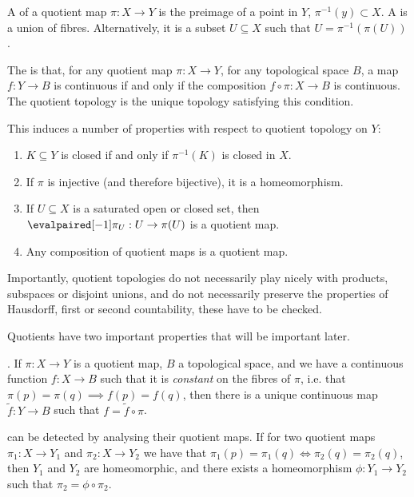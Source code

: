 A  of a quotient map \(\pi: X \to Y\) is the preimage of a point in \(Y\), \(\pi^{-1}(y) \subset X\).
A  is a union of fibres.
Alternatively, it is a subset \(U \subseteq X\) such that \(U = \pi^{-1}(\pi(U))\).

The  is that, for any quotient map \(\pi : X \to Y\), for any topological space \(B\), a map \(f: Y\to B\) is continuous if and only if the composition \(f \circ \pi : X \to B\) is continuous.
The quotient topology is the unique topology satisfying this condition.

This induces a number of properties with respect to quotient topology on \(Y\): \begin{enumerate}[noitemsep] \item \(K \subseteq Y\) is closed if and only if \(\pi^{-1}(K)\) is closed in \(X\).
	\item If \(\pi\) is injective (and therefore bijective), it is a homeomorphism.
	\item If \(U \subseteq X\) is a saturated open or closed set, then \(\eval{\pi}_U: U \to \pi(U)\) is a quotient map.
	\item Any composition of quotient maps is a quotient map.
\end{enumerate}

Importantly, quotient topologies do not necessarily play nicely with products, subspaces or disjoint unions, and do not necessarily preserve the properties of Hausdorff, first or second countability, these have to be checked.

Quotients have two important properties that will be important later.

.
If \(\pi: X\to Y\) is a quotient map, \(B\) a topological space, and we have a continuous function \(f: X\to B\) such that it is \emph{constant} on the fibres of \(\pi\), i.e. that \(\pi(p) = \pi(q) \implies f(p) = f(q)\), then there is a unique continuous map \(\tilde{f}: Y\to B\) such that \(f = \tilde{f}\circ\pi\).

 can be detected by analysing their quotient maps.
If for two quotient maps \(\pi_1: X\to Y_1\) and \(\pi_2: X \to Y_2\) we have that \(\pi_1(p) = \pi_1(q) \iff \pi_2(q) = \pi_2(q)\), then \(Y_1\) and \(Y_2\) are homeomorphic, and there exists a homeomorphism \(\phi: Y_1 \to Y_2\) such that \(\pi_2 = \phi \circ \pi_2\).

